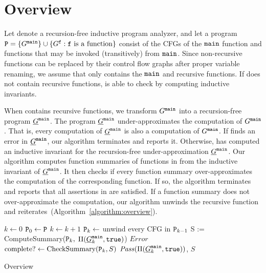 
\chapter{Overview}\label{ch:overview}

Let  denote a recursion-free inductive program analyzer,
and let a program $\textup{\texttt{{P}}}=\{G^{\mathtt{{main}}}\}\cup\{G^{\mathtt{{f}}} : \mathtt{{f}}\mbox{ is a function}\}$
consist of the CFGs of the $\mathtt{{main}}$ function and functions that may be
invoked (transitively) from $\mathtt{{main}}$.
Since non-recursive functions can be replaced by their control flow graphs
after proper variable renaming,
we assume that  only contains the $\mathtt{{main}}$ and recursive functions.
If  does not contain recursive functions,
 is able to check  by computing inductive invariants.


When  contains recursive functions, we transform $G^{\mathtt{{main}}}$ into a
recursion-free program $\underline{G}^{\mathtt{{main}}}$. The program $\underline{G}^{\mathtt{{main}}}$
under-approximates the computation of $G^{\mathtt{{main}}}$. That is, every computation
of $\underline{G}^{\mathtt{{main}}}$ is also a computation of $G^{\mathtt{{main}}}$. If
 finds an error in $\underline{G}^{\mathtt{{main}}}$, our
algorithm terminates and reports it. Otherwise,
 has computed an inductive invariant for the
recursion-free under-approximation $\underline{G}^{\mathtt{{main}}}$. Our algorithm
computes function summaries of functions in  from the inductive invariant of
$\underline{G}^{\mathtt{{main}}}$. It then checks if every function summary
over-approximates the computation of the corresponding function. If
so, the algorithm terminates and reports that all assertions in 
are satisfied. If a function summary does not over-approximate the
computation, our algorithm unwinds the recursive function and
reiterates~(Algorithm~\ref{algorithm:overview}).

\begin{algorithm}[htb]
\begin{doublespace}

  $k \leftarrow 0$\;
  $\textup{\texttt{{P}}}_0 \leftarrow \textup{\texttt{{P}}}$\;
  {
    $k \leftarrow k + 1$\;
    $\textup{\texttt{{P}}}_{k} \leftarrow $ unwind every CFG in $\textup{\texttt{{P}}}_{k-1}$\;
    {
      {    
        S := ComputeSummary($\textup{\texttt{{P}}}_k,$ $\Pi (\underline{G}^{\mathtt{{main}}}_k, \mathtt{true})$)
      }
      {
        \Return $\mathit{Error}$
      }
    }
    $\textmd{complete?} \leftarrow \textmd{CheckSummary} (\textup{\texttt{{P}}}_k, S)$\;
  }
  \Return $\mathit{Pass} (\Pi (\underline{G}^{\mathtt{{main}}}_k, \mathtt{true}))$, $S$\;
\end{doublespace}
  \caption{Overview}
  \label{algorithm:overview}
\end{algorithm} 

